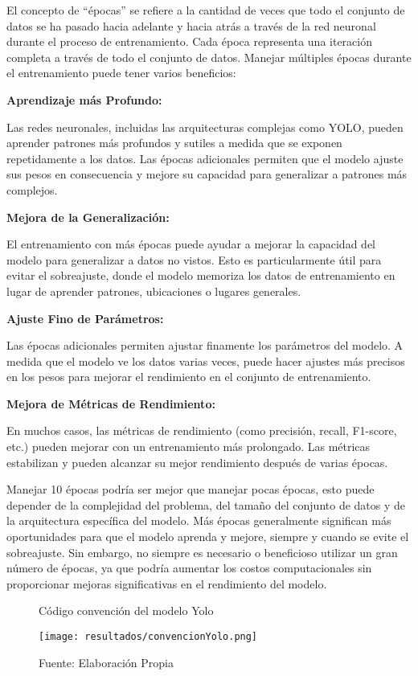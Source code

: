 El concepto de ``épocas'' se refiere a la cantidad de veces que todo el conjunto de datos se ha pasado hacia adelante y hacia atrás a través de la red neuronal durante el proceso de entrenamiento. Cada época representa una iteración completa a través de todo el conjunto de datos.
Manejar múltiples épocas durante el entrenamiento puede tener varios beneficios:

\textbf{Aprendizaje más Profundo:}

Las redes neuronales, incluidas las arquitecturas complejas como YOLO, pueden aprender patrones más profundos y sutiles a medida que se exponen repetidamente a los datos. Las épocas adicionales permiten que el modelo ajuste sus pesos en consecuencia y mejore su capacidad para generalizar a patrones más complejos.

\textbf{Mejora de la Generalización:}

El entrenamiento con más épocas puede ayudar a mejorar la capacidad del modelo para generalizar a datos no vistos. Esto es particularmente útil para evitar el sobreajuste, donde el modelo memoriza los datos de entrenamiento en lugar de aprender patrones, ubicaciones o lugares generales.

\textbf{Ajuste Fino de Parámetros:}

Las épocas adicionales permiten ajustar finamente los parámetros del modelo. A medida que el modelo ve los datos varias veces, puede hacer ajustes más precisos en los pesos para mejorar el rendimiento en el conjunto de entrenamiento.

\textbf{Mejora de Métricas de Rendimiento:}

En muchos casos, las métricas de rendimiento (como precisión, recall, F1-score, etc.) pueden mejorar con un entrenamiento más prolongado. Las métricas estabilizan y pueden alcanzar su mejor rendimiento después de varias épocas.

\newpage

Manejar 10 épocas podría ser mejor que manejar pocas épocas, esto puede depender de la complejidad del problema, del tamaño del conjunto de datos y de la arquitectura específica del modelo. Más épocas generalmente significan más oportunidades para que el modelo aprenda y mejore, siempre y cuando se evite el sobreajuste. Sin embargo, no siempre es necesario o beneficioso utilizar un gran número de épocas, ya que podría aumentar los costos computacionales sin proporcionar mejoras significativas en el rendimiento del modelo.

\begin{figure}[h]
\centering
\caption{Código convención del modelo Yolo}
\texttt{[image: resultados/convencionYolo.png]}
\caption*{\footnotesize Fuente: Elaboración Propia}
\label{fig:figuraConvencionYolo}
\end{figure}

